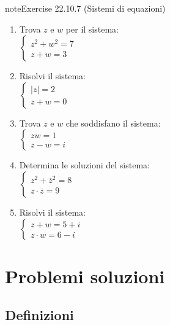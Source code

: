 \documentclass[letterpaper,10pt,italian]{jupyterBook}
\begin{document}
\begin{sphinxadmonition}{note}{Exercise 22.10.7 (Sistemi di equazioni)}
\begin{enumerate}
\item {} 
\sphinxAtStartPar
Trova \(z\) e \(w\) per il sistema:\\
\(\begin{cases} 
z^2 + w^2 = 7 \\
z + w = 3 
\end{cases}\)

\item {} 
\sphinxAtStartPar
Risolvi il sistema:\\
\(\begin{cases} 
|z| = 2 \\
z + w = 0 
\end{cases}\)

\item {} 
\sphinxAtStartPar
Trova \(z\) e \(w\) che soddisfano il sistema:\\
\(\begin{cases} 
z w = 1 \\
z - w = i 
\end{cases}\)

\item {} 
\sphinxAtStartPar
Determina le soluzioni del sistema:\\
\(\begin{cases} 
z^2 + \overline{z}^2 = 8 \\
z \cdot \overline{z} = 9 
\end{cases}\)

\item {} 
\sphinxAtStartPar
Risolvi il sistema:\\
\(\begin{cases} 
z + w = 5 + i \\
z \cdot w = 6 - i 
\end{cases}\)

\end{enumerate}
\end{sphinxadmonition}

\sphinxstepscope


\section{Problemi \sphinxhyphen{} soluzioni}
\label{\detokenize{ch/algebra/complex-algebra-sol:problemi-soluzioni}}\label{\detokenize{ch/algebra/complex-algebra-sol:math-hs-algebra-complex-sol}}\label{\detokenize{ch/algebra/complex-algebra-sol::doc}}

\subsection{Definizioni}
\label{\detokenize{ch/algebra/complex-algebra-sol:definizioni}}\label{\detokenize{ch/algebra/complex-algebra-sol:math-hs-algebra-complex-sol-def}}
\end{document}
